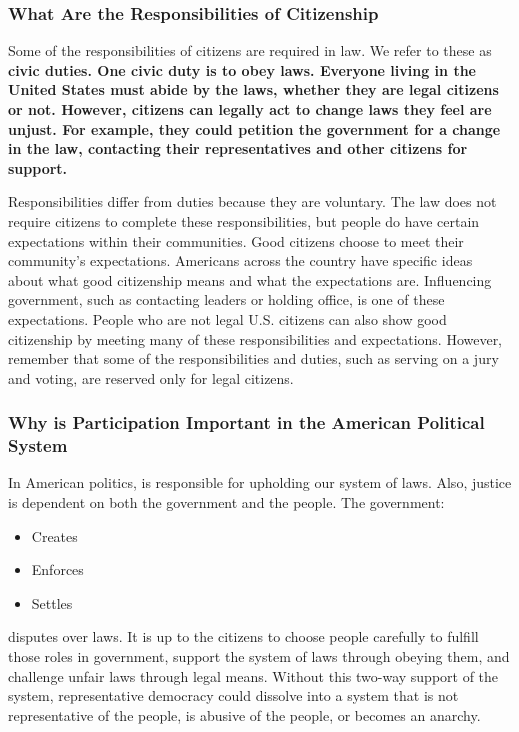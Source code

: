 
\subsubsection*{What Are the Responsibilities of Citizenship}

Some of the responsibilities of citizens are required in law. We refer to these
as \bf{civic duties}. One civic duty is to obey laws. Everyone living in
the United States must abide by the laws, whether they are legal citizens or
not. However, citizens can legally act to change laws they feel are unjust. For
example, they could petition the government for a change in the law, contacting
their representatives and other citizens for support.

Responsibilities differ from duties because they are voluntary. The law does
not require citizens to complete these responsibilities, but people do have
certain expectations within their communities. Good citizens choose to meet
their community's expectations. Americans across the country have specific
ideas about what good citizenship means and what the expectations are.
Influencing government, such as contacting leaders or holding office, is one of
these expectations. People who are not legal U.S. citizens can also show good
citizenship by meeting many of these responsibilities and expectations.
However, remember that some of the responsibilities and duties, such as serving
on a jury and voting, are reserved only for legal citizens.

\subsubsection*{Why is Participation Important in the American Political System}

In American politics, is responsible for upholding our system of laws. Also,
justice is dependent on both the government and the people. The government:

\begin{itemize}
    \item Creates
    \item Enforces
    \item Settles
\end{itemize}

disputes over laws. It is up to the citizens to choose people carefully to
fulfill those roles in government, support the system of laws through obeying
them, and challenge unfair laws through legal means. Without this two-way
support of the system, representative democracy could dissolve into a system
that is not representative of the people, is abusive of the people, or becomes
an anarchy.

